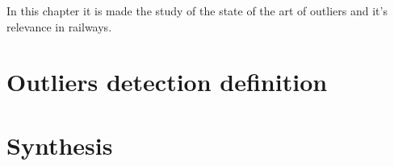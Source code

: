 In this chapter it is  made the study of the state of the art of outliers and it's relevance in railways.


\section{Outliers detection definition}

\lipsum[1]


\section{Synthesis}